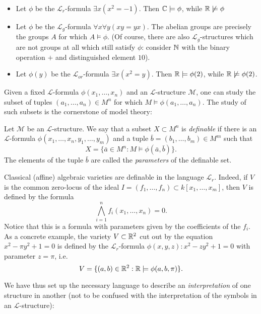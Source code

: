 \begin{example}
	\begin{itemize}
		\item Let $\phi$ be the $\mathcal{L}_r$-formula $\exists x (x^2=-1)$. Then $\mathbb{C}\models \phi$, while $\mathbb{R}\not\models \phi$
		\item Let $\phi$ be the $\mathcal{L}_g$-formula $\forall x\forall y(xy=yx)$. The abelian groups are precisely the groups $A$ for which $A\models \phi$. (Of course, there are also $\mathcal{L}_g$-structures which are not groups at all which still satisfy $\phi$: consider $\mathbb{N}$ with the binary operation $+$ and distinguished element $10$).
		\item Let $\phi(y)$ be the $\mathcal{L}_{or}$-formula $\exists x(x^2=y)$. Then $\mathbb{R}\models\phi(2)$, while $\mathbb{R}\not\models\phi(2)$.
	\end{itemize}
\end{example}

Given a fixed $\mathcal{L}$-formula $\phi(x_1,\dots, x_n)$ and an $\mathcal{L}$-structure $\mathcal{M}$, one can study the subset of tuples $(a_1,\dots, a_n)\in M^n$ for which $M\models \phi(a_1,\dots, a_n)$. The study of such subsets is the cornerstone of model theory:

\begin{definition}
Let $\mathcal{M}$ be an $\mathcal{L}$-structure. We say that a subset $X\subset M^n$ is \emph{definable} if there is an $\mathcal{L}$-formula $\phi(x_1,\dots, x_n, y_1,\dots, y_m)$ and a tuple $\bar{b}=(b_1,\dots, b_m)\in M^m$ such that $$X=\{\bar{a}\in M^n: M\models \phi(\bar{a},\bar{b})\}.$$ The elements of the tuple $\bar{b}$ are called the \emph{parameters} of the definable set.
\end{definition}

\begin{example}
Classical (affine) algebraic varieties are definable in the language $\mathcal{L}_r$. Indeed, if $V$ is the common zero-locus of the ideal $I=(f_1,\dots, f_n)\subset k[x_1,\dots,x_m]$, then $V$ is defined by the formula $$\bigwedge_{i=1}^n f_i(x_1,\dots, x_n)=0.$$ Notice that this is a formula with parameters given by the coefficients of the $f_i$. As a concrete example, the variety $V\subset\mathbb{R}^2$ cut out by the equation $x^2-\pi y^2+1=0$ is defined by the $\mathcal{L}_r$-formula $\phi(x,y,z): x^2-zy^2+1=0$ with parameter $z=\pi$, i.e. $$V=\{(a,b)\in\mathbb{R}^2: \mathbb{R}\models\phi(a,b,\pi)\}.$$
\end{example}

We have thus set up the necessary language to describe an \emph{interpretation} of one structure in another (not to be confused with the interpretation of the symbols in an $\mathcal{L}$-structure):

